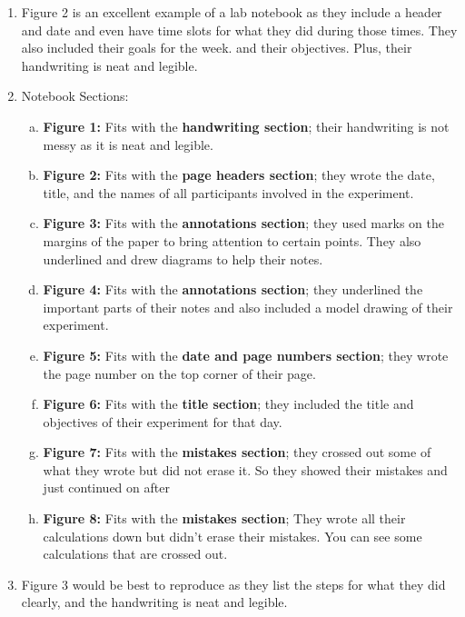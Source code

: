 \documentclass[idxtotoc,hyperref,openany]{labbook} %
\begin{document}

\begin{enumerate}
    \item Figure 2 is an excellent example of a lab notebook as they include a header and date and even have time slots for what they did during those times. They also included their goals for the week. and their objectives. Plus, their handwriting is neat and legible.
    \item Notebook Sections:
    \begin{enumerate}[(a)]
        \item \textbf{Figure 1:} Fits with the \textbf{handwriting section}; their handwriting is not messy as it is neat and legible.
        \item \textbf{Figure 2:} Fits with the \textbf{page headers section}; they wrote the date, title, and the names of all participants involved in the experiment.
        \item \textbf{Figure 3:} Fits with the \textbf{annotations section}; they used marks on the margins of the paper to bring attention to certain points. They also underlined and drew diagrams to help their notes.
        \item \textbf{Figure 4:} Fits with the \textbf{annotations section}; they underlined the important parts of their notes and also included a model drawing of their experiment.
        \item \textbf{Figure 5:} Fits with the \textbf{date and page numbers section}; they wrote the page number on the top corner of their page.
        \item \textbf{Figure 6:} Fits with the \textbf{title section}; they included the title and objectives of their experiment for that day.
        \item \textbf{Figure 7:} Fits with the \textbf{mistakes section}; they crossed out some of what they wrote but did not erase it. So they showed their mistakes and just continued on after
        \item \textbf{Figure 8:} Fits with the \textbf{mistakes section}; They wrote all their calculations down but didn't erase their mistakes. You can see some calculations that are crossed out.
    \end{enumerate}
    \item Figure 3 would be best to reproduce as they list the steps for what they did clearly, and the handwriting is neat and legible.

\end{enumerate}
\end{document}
